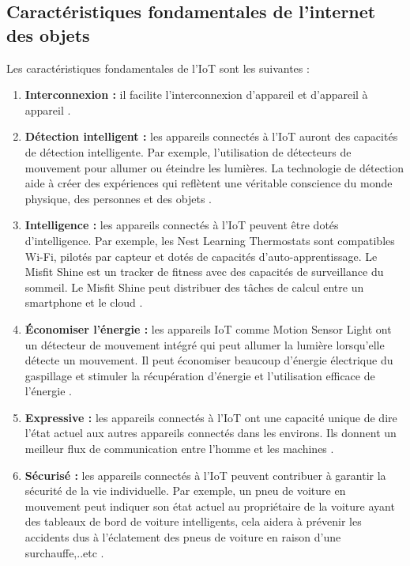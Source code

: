 \subsection{Caractéristiques fondamentales de l'internet des objets}
Les caractéristiques fondamentales de l'IoT sont les suivantes :
\begin{enumerate}
    \item \textbf{Interconnexion :} il facilite l'interconnexion d'appareil et d'appareil à appareil \cite{fortino2018towards}.


\item \textbf{Détection intelligent :} les appareils connectés à l'IoT auront des capacités de détection intelligente. Par exemple, l'utilisation de détecteurs de mouvement pour allumer ou éteindre les lumières. La technologie de détection aide à créer des expériences qui reflètent une véritable conscience du monde physique, des personnes et des objets \cite{chen2017smart}.


\item \textbf{Intelligence :} les appareils connectés à l'IoT peuvent être dotés d'intelligence. Par exemple, les Nest Learning Thermostats sont compatibles Wi-Fi, pilotés par capteur et dotés de capacités d'auto-apprentissage. Le Misfit Shine est un tracker de fitness avec des capacités de surveillance du sommeil. Le Misfit Shine peut distribuer des tâches de calcul entre un smartphone et le cloud \cite{zhou2017computation}.


\item \textbf{Économiser l'énergie :} les appareils IoT comme Motion Sensor Light ont un détecteur de mouvement intégré qui peut allumer la lumière lorsqu'elle détecte un mouvement. Il peut économiser beaucoup d'énergie électrique du gaspillage et stimuler la récupération d'énergie et l'utilisation efficace de l'énergie  \cite{mainetti2011evolution}.


\item \textbf{Expressive :} les appareils connectés à l'IoT ont une capacité unique de dire l'état actuel aux autres appareils connectés dans les environs. Ils donnent un meilleur flux de communication entre l'homme et les machines \cite{odelu2017expressive}.


\item \textbf{Sécurisé :} les appareils connectés à l'IoT peuvent contribuer à garantir la sécurité de la vie individuelle. Par exemple, un pneu de voiture en mouvement peut indiquer son état actuel au propriétaire de la voiture ayant des tableaux de bord de voiture intelligents, cela aidera à prévenir les accidents dus à l'éclatement des pneus de voiture en raison d'une surchauffe,..etc \cite{naik2017cyber}.
\end{enumerate}

